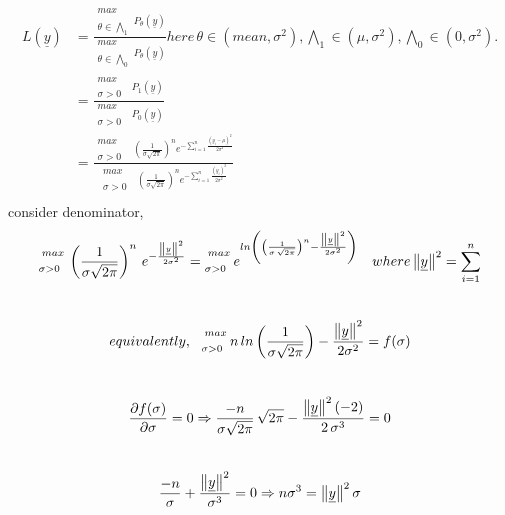 \documentclass[a4paper,english,12pt]{article}
\begin{document}
\begin{align*}
L(\underline{y})&=\frac{\substack{max\\ \\ \theta \in{\bigwedge}_1} P_\theta \left( \underline{y} \right)}{\substack{max\\ \\ \theta \in{\bigwedge}_0} P_\theta \left( \underline{y} \right)} here\, \theta \in (mean,\sigma^2),{\bigwedge}_1 \in (\mu,\sigma^2),{\bigwedge}_0 \in (0,\sigma^2).\\
&=\frac{\substack{max\\ \\ \sigma >0 \,\,\,\,} P_1(\underline{y})}{\substack{max\\ \\ \sigma >0 \,\,\,\,} P_0(\underline{y})}\\
&=\frac{\substack{max\\ \\ \sigma >0 \,\,\,\,}\, \left(\frac{1}{\sigma \sqrt{2\pi}}\right)^n e^{- \sum \limits_{i=1}^n \frac{(y_i-\mu)^2}{2\sigma^2}}}{\substack{max\\ \\ \sigma >0 \,\,\,\,}\left(\frac{1}{\sigma \sqrt{2\pi}}\right)^n e^{- \sum \limits_{i=1}^n\frac{(y_i)^2}{2\sigma^2}}}\\
\end{align*}
consider denominator,\\
$$\substack{max\\ \\ \sigma >0 \,\,\,\,}\left(\frac{1}{\sigma \sqrt{2\pi}}\right)^n \, e^{-\frac{ \left\lVert\underline{y}\right\rVert^2}{2 \sigma^2}}=\substack{max\\ \\ \sigma >0 \,\,\,\,}e^{ln\left(\left(\frac{1}{\sigma\, \sqrt{2 \pi}}\right)^n - \frac{\left\lVert\underline{y}\right\rVert^2}{2\sigma^2}\right)}\,\,\,\,\,\, where \left\lVert\underline{y}\right\rVert^2=\sum \limits_{i=1}^n$$ \\
$$equivalently,\,\,\,\,\substack{max\\ \\ \sigma >0 \,\,\,\,}n\,ln\left(\frac{1}{\sigma \sqrt{2 \pi}}\right)-\frac{\left\lVert\underline{y}\right\rVert^2}{2\sigma^2}=f(\sigma)$$\\
$$\frac{\partial f(\sigma)}{\partial \sigma}=0\Rightarrow \frac{-n}{\sigma \sqrt{2\pi}}\, \sqrt{2\pi}-\frac{\left\lVert\underline{y}\right\rVert^2(-2)}{2\,\sigma^3}=0$$\\
$$\frac{-n}{\sigma}+\frac{\left\lVert\underline{y}\right\rVert^2}{\sigma^3}=0\Rightarrow n\sigma^3=\left\lVert\underline{y}\right\rVert^2 \sigma$$\\
\end{document}
